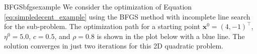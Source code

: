 \begin{example}{BFGS}{bfgsexample}
    We consider the optimization of Equation \eqref{eq:simpledecent_example} using the BFGS method with incomplete line search for the sub-problem. The optimization path for a starting point $\mathbf{x}^0= (4, -1)^\top$, $\eta^0=5.0$, $c=0.5$, and $\rho=0.8$ is shown in the plot below with a blue line. The solution converges in just two iterations for this 2D quadratic problem.
    \begin{center}
        
    \end{center}   
\end{example}



 


